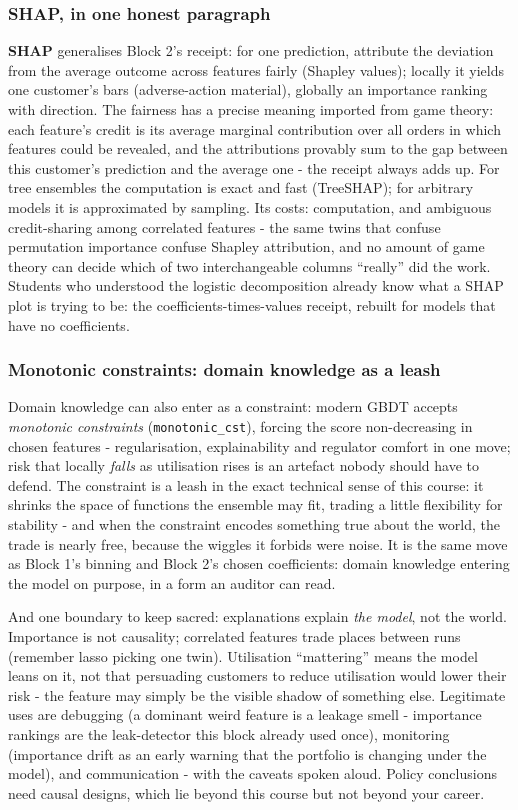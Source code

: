 \documentclass[11pt,a4paper]{article}
\begin{document}
\subsubsection{SHAP, in one honest paragraph}
\textbf{SHAP} generalises Block 2's receipt: for one
prediction, attribute the deviation from the average outcome across
features fairly (Shapley values); locally it yields one customer's bars
(adverse-action material), globally an importance ranking with direction.
The fairness has a precise meaning imported from game theory: each
feature's credit is its average marginal contribution over all orders
in which features could be revealed, and the attributions provably sum
to the gap between this customer's prediction and the average one -
the receipt always adds up. For tree ensembles the computation is
exact and fast (TreeSHAP); for arbitrary models it is approximated by
sampling.
Its costs: computation, and ambiguous credit-sharing among correlated
features - the same twins that confuse permutation importance confuse
Shapley attribution, and no amount of game theory can decide which of
two interchangeable columns ``really'' did the work. Students who understood the logistic decomposition already know
what a SHAP plot is trying to be: the coefficients-times-values
receipt, rebuilt for models that have no coefficients.

\subsubsection{Monotonic constraints: domain knowledge as a leash}
Domain knowledge can also enter as a constraint: modern GBDT accepts
\emph{monotonic constraints} (\texttt{monotonic\_cst}), forcing the score
non-decreasing in chosen features - regularisation, explainability and
regulator comfort in one move; risk that locally \emph{falls} as
utilisation rises is an artefact nobody should have to defend. The
constraint is a leash in the exact technical sense of this course: it
shrinks the space of functions the ensemble may fit, trading a little
flexibility for stability - and when the constraint encodes something
true about the world, the trade is nearly free, because the wiggles it
forbids were noise. It is the same move as Block 1's binning and
Block 2's chosen coefficients: domain knowledge entering the model on
purpose, in a form an auditor can read.

And one
boundary to keep sacred: explanations explain \emph{the model}, not the
world. Importance is not causality; correlated features trade places
between runs (remember lasso picking one twin). Utilisation
``mattering'' means the model leans on it, not that persuading
customers to reduce utilisation would lower their risk - the feature
may simply be the visible shadow of something else. Legitimate uses are
debugging (a dominant weird feature is a leakage smell - importance
rankings are the leak-detector this block already used once),
monitoring (importance drift as an early warning that the portfolio is
changing under the model), and communication - with the caveats spoken
aloud. Policy conclusions need causal designs, which lie beyond this course but
not beyond your career.
\end{document}
